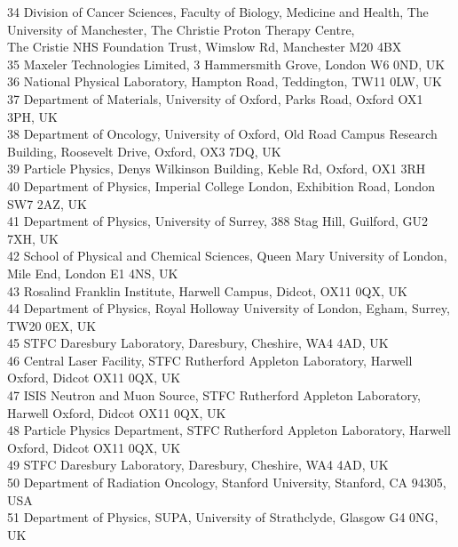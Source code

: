 {\begin{tabbing}
     34 \> Division of Cancer Sciences, Faculty of Biology, Medicine and Health, The University of Manchester, The Christie Proton Therapy Centre, \\ \> The Cristie NHS Foundation Trust, Wimslow Rd, Manchester M20 4BX\\
     35 \> Maxeler Technologies Limited, 3 Hammersmith Grove, London W6 0ND, UK\\
     36 \> National Physical Laboratory, Hampton Road, Teddington, TW11 0LW, UK\\
     37 \> Department of Materials, University of Oxford, Parks Road, Oxford OX1 3PH, UK\\
     38 \> Department of Oncology, University of Oxford, Old Road Campus Research Building, Roosevelt Drive, Oxford, OX3 7DQ, UK\\
     39 \> Particle Physics, Denys Wilkinson Building, Keble Rd, Oxford, OX1 3RH\\
     40 \> Department of Physics, Imperial College London, Exhibition Road, London SW7 2AZ, UK\\
     41 \> Department of Physics, University of Surrey, 388 Stag Hill, Guilford, GU2 7XH, UK\\
     42 \> School of Physical and Chemical Sciences, Queen Mary University of London, Mile End, London E1 4NS, UK\\
     43 \> Rosalind Franklin Institute, Harwell Campus, Didcot, OX11 0QX, UK\\
     44 \> Department of Physics, Royal Holloway University of London, Egham, Surrey, TW20 0EX, UK\\
     45 \> STFC Daresbury Laboratory, Daresbury, Cheshire, WA4 4AD, UK\\
     46 \> Central Laser Facility, STFC Rutherford Appleton Laboratory, Harwell Oxford, Didcot OX11 0QX, UK\\
     47 \> ISIS Neutron and Muon Source, STFC Rutherford Appleton Laboratory, Harwell Oxford, Didcot OX11 0QX, UK\\
     48 \> Particle Physics Department, STFC Rutherford Appleton Laboratory, Harwell Oxford, Didcot OX11 0QX, UK\\
     49 \> STFC Daresbury Laboratory, Daresbury, Cheshire, WA4 4AD, UK\\
     50 \> Department of Radiation Oncology, Stanford University, Stanford, CA 94305, USA\\
     51 \> Department of Physics, SUPA, University of Strathclyde, Glasgow G4 0NG, UK\\

\end{tabbing}}
